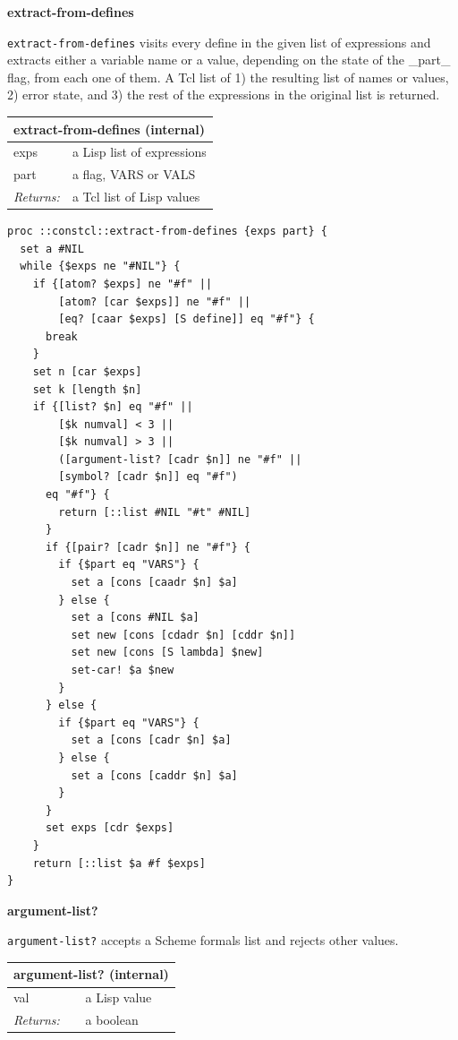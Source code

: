 \documentclass[twoside,9pt]{report}
\begin{document}
\textbf{extract-from-defines}


\texttt{extract-from-defines} visits every define in the given list of expressions and extracts either a variable name or a value, depending on the state of the \_part\_ flag, from each one of them. A Tcl list of 1) the resulting list of names or values, 2) error state, and 3) the rest of the expressions in the original list is returned.

\begin{tabular}{ |l l| }
\hline
\multicolumn{2}{|l|}{extract-from-defines (internal)} \\
\hline
exps & a Lisp list of expressions \\
part & a flag, VARS or VALS \\
\textit{Returns:} & a Tcl list of Lisp values \\
\hline
\end{tabular}

\noindent\makebox[\linewidth]{\rule{\linewidth}{0.4pt}}
\begin{lstlisting}
proc ::constcl::extract-from-defines {exps part} {
  set a #NIL
  while {$exps ne "#NIL"} {
    if {[atom? $exps] ne "#f" ||
        [atom? [car $exps]] ne "#f" ||
        [eq? [caar $exps] [S define]] eq "#f"} {
      break
    }
    set n [car $exps]
    set k [length $n]
    if {[list? $n] eq "#f" ||
        [$k numval] < 3 ||
        [$k numval] > 3 ||
        ([argument-list? [cadr $n]] ne "#f" ||
        [symbol? [cadr $n]] eq "#f")
      eq "#f"} {
        return [::list #NIL "#t" #NIL]
      }
      if {[pair? [cadr $n]] ne "#f"} {
        if {$part eq "VARS"} {
          set a [cons [caadr $n] $a]
        } else {
          set a [cons #NIL $a]
          set new [cons [cdadr $n] [cddr $n]]
          set new [cons [S lambda] $new]
          set-car! $a $new
        }
      } else {
        if {$part eq "VARS"} {
          set a [cons [cadr $n] $a]
        } else {
          set a [cons [caddr $n] $a]
        }
      }
      set exps [cdr $exps]
    }
    return [::list $a #f $exps]
}
\end{lstlisting}
\noindent\makebox[\linewidth]{\rule{\linewidth}{0.4pt}}

\textbf{argument-list?}


\texttt{argument-list?} accepts a Scheme formals list and rejects other values.

\begin{tabular}{ |l l| }
\hline
\multicolumn{2}{|l|}{argument-list? (internal)} \\
\hline
val & a Lisp value \\
\textit{Returns:} & a boolean \\
\hline
\end{tabular}
\end{document}

